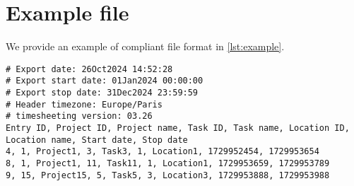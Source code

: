 \section{Example file} \label{sec:example}
We provide an example of compliant file format in \cref{lst:example}.

\begin{minipage}{\linewidth}
\begin{lstlisting}[caption={Compliant exported timesheet file.},
                   label={lst:example}]
# Export date: 26Oct2024 14:52:28
# Export start date: 01Jan2024 00:00:00
# Export stop date: 31Dec2024 23:59:59
# Header timezone: Europe/Paris
# timesheeting version: 03.26
Entry ID, Project ID, Project name, Task ID, Task name, Location ID, Location name, Start date, Stop date
4, 1, Project1, 3, Task3, 1, Location1, 1729952454, 1729953654
8, 1, Project1, 11, Task11, 1, Location1, 1729953659, 1729953789
9, 15, Project15, 5, Task5, 3, Location3, 1729953888, 1729953988
\end{lstlisting} \end{minipage}
